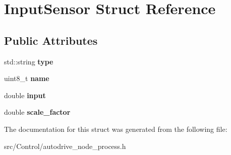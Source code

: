 \hypertarget{structInputSensor}{}\section{Input\+Sensor Struct Reference}
\label{structInputSensor}
\subsection*{Public Attributes}
\begin{DoxyCompactItemize}
\item 
\mbox{\label{structInputSensor_a0e56d5492aced49edc04023e803efdbe}} 
std\+::string {\bfseries type}
\item 
\mbox{\label{structInputSensor_a4add37b7b34d1083115fd1a9abeffbc8}} 
uint8\+\_\+t {\bfseries name}
\item 
\mbox{\label{structInputSensor_af50be55d80690ce59447a1a10f152e3d}} 
double {\bfseries input}
\item 
\mbox{\label{structInputSensor_aa94db5c5364aeed32268c33006fba068}} 
double {\bfseries scale\+\_\+factor}
\end{DoxyCompactItemize}


The documentation for this struct was generated from the following file\+:\begin{DoxyCompactItemize}
\item 
src/\+Control/autodrive\+\_\+node\+\_\+process.\+h\end{DoxyCompactItemize}
